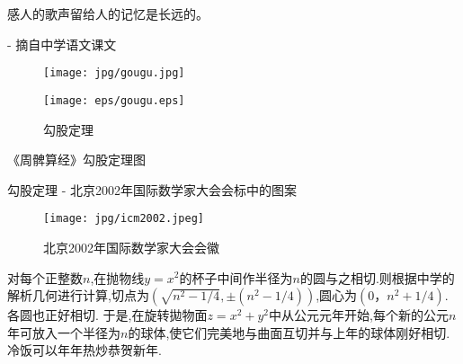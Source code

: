 \documentclass[main.tex]{subfiles}
\begin{document}
\begin{flushright}
	\begin{kaishu}
		感人的歌声留给人的记忆是长远的。\\
	\end{kaishu}
	- 摘自中学语文课文
\end{flushright}

\begin{figure}[h]
\centering
\begin{minipage}{.45\textwidth}
	\centering
	\texttt{[image: jpg/gougu.jpg]}
\end{minipage}
\begin{minipage}{.45\textwidth}
	\centering
	\texttt{[image: eps/gougu.eps]}
\end{minipage}
\caption{勾股定理}
 \label{fig:1.5.1}
\end{figure}	

{《周髀算经》勾股定理图}

勾股定理 - 北京2002年国际数学家大会会标中的图案
\begin{figure}[h]
	\centering
	\texttt{[image: jpg/icm2002.jpeg]}
	\caption{北京2002年国际数学家大会会徽}
	\label{fig:chap1.5.3}
\end{figure}	

对每个正整数$n$,在抛物线$y=x^2$的杯子中间作半径为$n$的圆与之相切.则根据中学的解析几何进行计算,切点为$(\sqrt{n^2-1/4}, \pm(n^2-1/4))$,圆心为$(0，n^2+1/4)$.各圆也正好相切.
于是,在旋转拋物面$z=x^2+y^2$中从公元元年开始,每个新的公元$n$年可放入一个半径为$n$的球体,使它们完美地与曲面互切并与上年的球体刚好相切.冷饭可以年年热炒恭贺新年.
\end{document}
